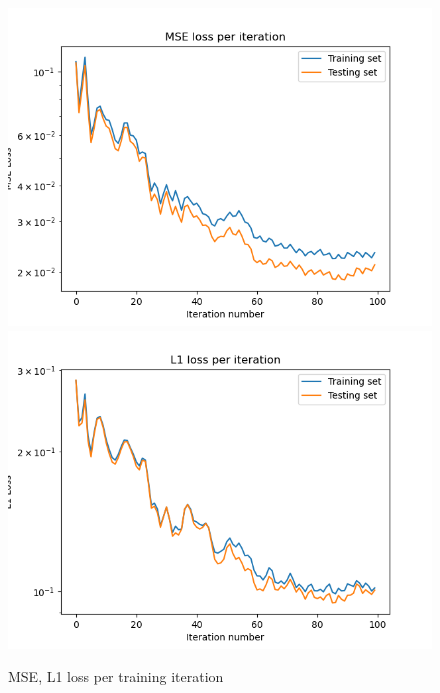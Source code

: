 \begin{figure}[h]
  \centering
  \includegraphics[scale=0.7]{figures/mse-loss.png}
  \includegraphics[scale=0.7]{figures/l1-loss.png}
  \caption{MSE, L1 loss per training iteration}
  \label{fig:loss_log}
\end{figure}

